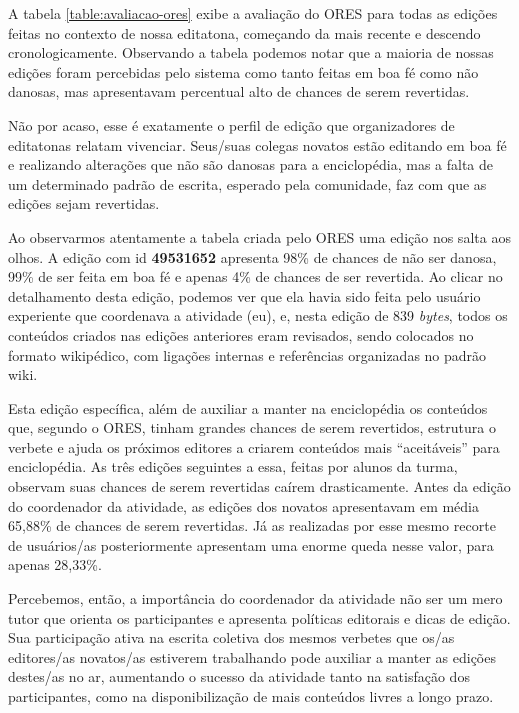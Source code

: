 A tabela \ref{table:avaliacao-ores} exibe a avaliação do ORES para todas as edições feitas no contexto de nossa editatona, começando da mais recente e descendo cronologicamente. Observando a tabela podemos notar que a maioria de nossas edições foram percebidas pelo sistema como tanto feitas em boa fé como não danosas, mas apresentavam percentual alto de chances de serem revertidas.

Não por acaso, esse é exatamente o perfil de edição que organizadores de editatonas relatam vivenciar. Seus/suas colegas novatos estão editando em boa fé e realizando alterações que não são danosas para a enciclopédia, mas a falta de um determinado padrão de escrita, esperado pela comunidade, faz com que as edições sejam revertidas.

Ao observarmos atentamente a tabela criada pelo ORES uma edição nos salta aos olhos. A edição com id \textbf{49531652} apresenta 98\% de chances de não ser danosa, 99\% de ser feita em boa fé e apenas 4\% de chances de ser revertida. Ao clicar no detalhamento desta edição, podemos ver que ela havia sido feita pelo usuário experiente que coordenava a atividade (eu), e, nesta edição de 839 \textit{bytes}, todos os conteúdos criados nas edições anteriores eram revisados, sendo colocados no formato wikipédico, com ligações internas e referências organizadas no padrão wiki.

Esta edição específica, além de auxiliar a manter na enciclopédia os conteúdos que, segundo o ORES, tinham grandes chances de serem revertidos, estrutura o verbete e ajuda os próximos editores a criarem conteúdos mais ``aceitáveis'' para enciclopédia. As três edições seguintes a essa, feitas por alunos da turma, observam suas chances de serem revertidas caírem drasticamente. Antes da edição do coordenador da atividade, as edições dos novatos apresentavam em média 65,88\% de chances de serem revertidas. Já as realizadas por esse mesmo recorte de usuários/as posteriormente apresentam uma enorme queda nesse valor, para apenas 28,33\%.

Percebemos, então, a importância do coordenador da atividade não ser um mero tutor que orienta os participantes e apresenta políticas editorais e dicas de edição. Sua participação ativa na escrita coletiva dos mesmos verbetes que os/as editores/as novatos/as estiverem trabalhando pode auxiliar a manter as edições destes/as no ar, aumentando o sucesso da atividade tanto na satisfação dos participantes, como na disponibilização de mais conteúdos livres a longo prazo.

